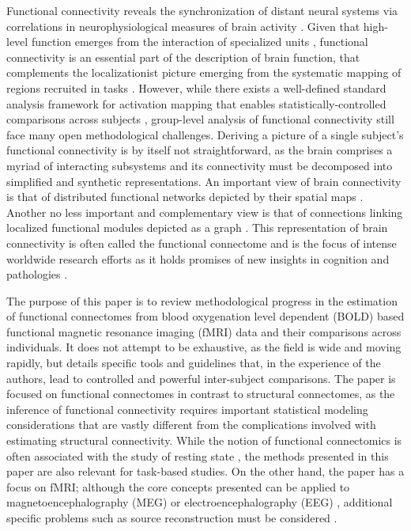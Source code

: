\documentclass[5p]{elsarticle}
\begin{document}
Functional connectivity reveals the synchronization of distant neural systems
via correlations in neurophysiological measures of brain activity 
\cite{friston1993, biswal1995}.  Given that
high-level function emerges from the interaction of specialized units
\cite{tononi1992},
functional connectivity is an essential part of the description of brain
function, that complements the localizationist picture emerging from the
systematic mapping of regions recruited in tasks \cite{sporns2004}. However,
while there exists a well-defined standard analysis framework for activation
mapping that enables statistically-controlled comparisons across subjects
\cite{friston1995}, group-level analysis of functional connectivity still face
many open methodological challenges. Deriving a picture of a single subject's
functional connectivity is by itself not straightforward, as the brain comprises
a myriad of interacting subsystems and its connectivity must be decomposed into
simplified and synthetic representations. An important view of brain
connectivity is that of distributed functional networks depicted by their
spatial maps \cite{fox2005}. Another no less important and complementary view is
that of connections linking localized functional modules depicted as a graph
\cite{bullmore2009}. This representation of brain connectivity is often called
the functional connectome \cite{sporns2005} and is the focus of intense
worldwide research efforts as it holds promises of new insights in cognition and
pathologies \cite{greicius2008b,biswal2010,fox2010}.

The purpose of this paper is to review methodological progress in the
estimation of functional connectomes from blood oxygenation level dependent
(BOLD) based functional magnetic resonance imaging (fMRI) data and their
comparisons across individuals.  It does not attempt
to be exhaustive, as the field is wide and moving rapidly, but details
specific tools and guidelines that, in the experience of the authors,
lead to controlled and powerful inter-subject comparisons. The paper is
focused on functional connectomes in contrast to structural connectomes,
as the inference of functional connectivity requires important statistical
modeling considerations that are vastly different from the complications involved
with estimating structural connectivity.
While the notion of functional
connectomics is often associated with the study of resting state
\cite{biswal2010}, the methods presented in this paper are also relevant
for task-based studies. On the other hand, the paper has a focus on fMRI;
although the core concepts presented can be applied to 
magnetoencephalography (MEG) or electroencephalography (EEG)
\cite{stam2004}, additional specific problems such as source
reconstruction must be considered \cite{schoffelen2009}.
\end{document}
